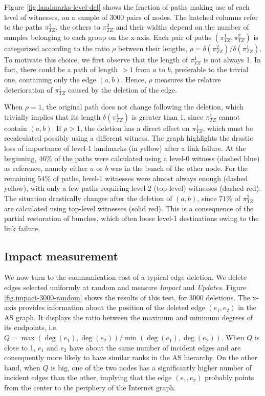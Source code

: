 \documentclass[a4paper,11pt,oneside]{report}
\begin{document}
\bigskip
Figure \ref{fig.landmarks-level-del} shows the fraction of paths making use of each level of witnesses, on a sample of 3000 pairs of nodes. The hatched columns refer to the paths $\pi_{TZ}^1$, the others to $\pi_{TZ}^2$ and their widths depend on the number of samples belonging to each group on the x-axis. Each pair of paths $(\pi_{TZ}^1, \pi_{TZ}^2)$ is categorized according to the ratio $\rho$ between their lengths, $\rho = \delta(\pi_{TZ}^2) / \delta(\pi_{TZ}^1)$. To motivate this choice, we first observe that the length of $\pi_{TZ}^1$ is not always 1. In fact, there could be a path of length $>1$ from $a$ to $b$, preferable to the trivial one, containing only the edge $(a, b)$. Hence, $\rho$ measures the relative deterioration of $\pi_{TZ}^1$ caused by the deletion of the edge.

When $\rho=1$, the original path does not change following the deletion, which trivially implies that its length $\delta(\pi_{TZ}^1)$ is greater than 1, since $\pi_{TZ}^1$ cannot contain $(a,b)$. If $\rho > 1$, the deletion has a direct effect on $\pi_{TZ}^1$, which must be recalculated possibly using a different witness. The graph highlights the drastic loss of importance of level-1 landmarks (in yellow) after a link failure. At the beginning, $46\%$ of the paths were calculated using a level-0 witness (dashed blue) as reference, namely either $a$ or $b$ was in the bunch of the other node. For the remaining $54\%$ of paths, level-1 witnesses were almost always enough (dashed yellow), with only a few paths requiring level-2 (top-level) witnesses (dashed red). The situation drastically changes after the deletion of $(a, b)$, since $71\%$ of $\pi_{TZ}^2$ are calculated using top-level witnesses (solid red). This is a consequence of the partial restoration of bunches, which often loose level-1 destinations owing to the link failure.

\subsection{Impact measurement}
\label{sub.impact-measurement}
We now turn to the communication cost of a typical edge deletion. We delete edges selected uniformly at random and measure \textit{Impact} and \textit{Updates}. Figure \ref{fig.impact-3000-random} shows the results of this test, for 3000 deletions. The x-axis provides information about the position of the deleted edge $(e_1, e_2)$ in the AS graph. It displays the ratio between the maximum and minimum degrees of its endpoints, i.e. $Q = \max(\deg(e_1), \deg(e_2))/\min(\deg(e_1), \deg(e_2))$. When $Q$ is close to 1, $e_1$ and $e_2$ have about the same number of incident edges and are consequently more likely to have similar ranks in the AS hierarchy. On the other hand, when $Q$ is big, one of the two nodes has a significantly higher number of incident edges than the other, implying that the edge $(e_1, e_2)$ probably points from the center to the periphery of the Internet graph.
\end{document}
